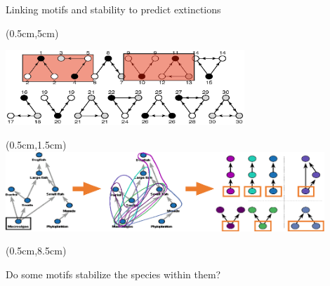 \documentclass{beamer}
\begin{document}
  \begin{frame}{Linking motifs and stability to predict extinctions}

    \begin{textblock*}{12cm}(0.5cm,5cm)
      \begin{center}
        \includegraphics[width=9cm]{intro_figs/stable_motifs_and_positions.eps}
        \end{center}       
    \end{textblock*}     

      \begin{textblock*}{12cm}(0.5cm,1.5cm)
        \includegraphics[width=12cm]{intro_figs/role_breakdown.eps}
        \end{textblock*} 

    \begin{textblock*}{12cm}(0.5cm,8.5cm)
      \begin{center}
        {\color{DarkBlue}Do some motifs stabilize the species within them?}
        \end{center}       
    \end{textblock*} 

    \end{frame}
\end{document}
